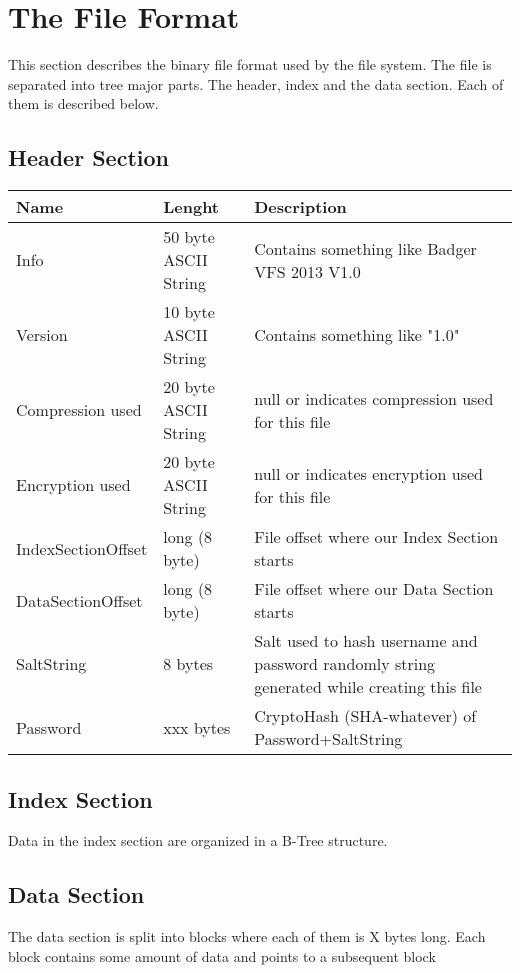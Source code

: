 
\section{The File Format}


This section describes the binary file format used by the file system. The file is separated into tree major parts. The header, index and the data section. Each of them is described below.

\subsection{Header Section}

\begin{tabular}{|l|l|p{5cm}|}
\hline
  \textbf{Name} & \textbf{Lenght} & \textbf{Description}
\\  \hline
  Info & 50 byte ASCII String & Contains something like Badger VFS 2013 V1.0 
\\ \hline
  Version & 10 byte ASCII String & Contains something like "1.0"
\\ \hline
  Compression used & 20 byte ASCII String & null or indicates compression used for this file
\\ \hline
  Encryption used & 20 byte ASCII String & null or indicates encryption used for this file
\\ \hline
 IndexSectionOffset & long (8 byte) &  File offset where our Index Section starts
\\ \hline
 DataSectionOffset & long (8 byte) &  File offset where our Data Section starts
\\ \hline
 SaltString & 8 bytes  & Salt used to hash username and password randomly string generated while creating this
   file
 \\ \hline
  Password & xxx bytes  & CryptoHash (SHA-whatever) of Password+SaltString
\\ \hline

\end{tabular}


\subsection{Index Section}

Data in the index section are organized in a B-Tree structure.


\subsection{Data Section}
The data section is split into blocks where each of them is X bytes long. Each block contains some amount of data and points to a subsequent block


